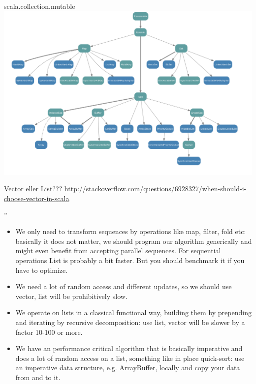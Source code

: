 \begin{Slide}{scala.collection.mutable}
\includegraphics[width=1.05\textwidth]{../img/collection/collection-mutable}
\end{Slide}


\begin{Slide}{Vector eller List???}\SlideFontTiny
\url{http://stackoverflow.com/questions/6928327/when-should-i-choose-vector-in-scala}

''
\begin{itemize}
\item We only need to transform sequences by operations like map, filter, fold etc: basically it does not matter, we should program our algorithm generically and might even benefit from accepting parallel sequences. For sequential operations List is probably a bit faster. But you should benchmark it if you have to optimize.

\item We need a lot of random access and different updates, so we should use vector, list will be prohibitively slow.

\item We operate on lists in a classical functional way, building them by prepending and iterating by recursive decomposition: use list, vector will be slower by a factor 10-100 or more.

\item We have an performance critical algorithm that is basically imperative and does a lot of random access on a list, something like in place quick-sort: use an imperative data structure, e.g. ArrayBuffer, locally and copy your data from and to it.


\end{itemize}
\end{Slide}



\fi





